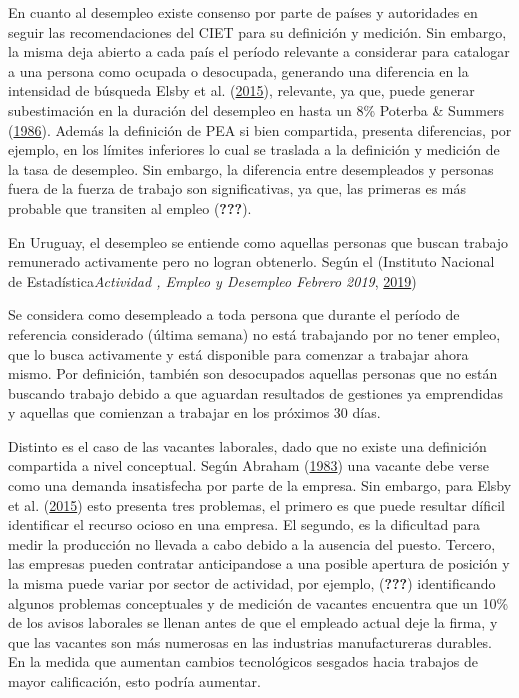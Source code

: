 \documentclass[12pt,twoside]{reedthesis}
\begin{document}
En cuanto al desempleo existe consenso por parte de países y autoridades en seguir las recomendaciones del CIET para su definición y medición. Sin embargo, la misma deja abierto a cada país el período relevante a considerar para catalogar a una persona como ocupada o desocupada, generando una diferencia en la intensidad de búsqueda Elsby et al. (\protect\hyperlink{ref-Elsby2015}{2015}), relevante, ya que, puede generar subestimación en la duración del desempleo en hasta un 8\% Poterba \& Summers (\protect\hyperlink{ref-Poterba1986}{1986}). Además la definición de PEA si bien compartida, presenta diferencias, por ejemplo, en los límites inferiores lo cual se traslada a la definición y medición de la tasa de desempleo. Sin embargo, la diferencia entre desempleados y personas fuera de la fuerza de trabajo son significativas, ya que, las primeras es más probable que transiten al empleo ({\textbf{???}}).

En Uruguay, el desempleo se entiende como aquellas personas que buscan trabajo remunerado activamente pero no logran obtenerlo. Según el (Instituto Nacional de Estadística\emph{Actividad , Empleo y Desempleo Febrero 2019}, \protect\hyperlink{ref-INE2019}{2019})
\begin{center}
    \begin{minipage}{0.95\linewidth}
        \vspace{1pt}
        {\small
Se considera como desempleado a toda persona que durante el período de referencia considerado (última semana) no está trabajando por no tener empleo, que lo busca activamente y está disponible para comenzar a trabajar ahora mismo. Por definición, también son desocupados aquellas personas que no están buscando trabajo debido a que aguardan resultados de gestiones ya emprendidas y aquellas que comienzan a trabajar en los próximos 30 días.}
        \vspace{1pt}
    \end{minipage}
\end{center}
Distinto es el caso de las vacantes laborales, dado que no existe una definición compartida a nivel conceptual. Según Abraham (\protect\hyperlink{ref-Abraham1983}{1983}) una vacante debe verse como una demanda insatisfecha por parte de la empresa. Sin embargo, para Elsby et al. (\protect\hyperlink{ref-Elsby2015}{2015}) esto presenta tres problemas, el primero es que puede resultar díficil identificar el recurso ocioso en una empresa. El segundo, es la dificultad para medir la producción no llevada a cabo debido a la ausencia del puesto. Tercero, las empresas pueden contratar anticipandose a una posible apertura de posición y la misma puede variar por sector de actividad, por ejemplo, ({\textbf{???}}) identificando algunos problemas conceptuales y de medición de vacantes encuentra que un 10\% de los avisos laborales se llenan antes de que el empleado actual deje la firma, y que las vacantes son más numerosas en las industrias manufactureras durables. En la medida que aumentan cambios tecnológicos sesgados hacia trabajos de mayor calificación, esto podría aumentar.
\end{document}
